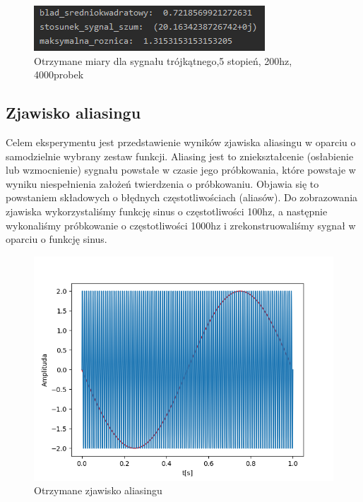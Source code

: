 \documentclass[12pt]{article}
\begin{document}
\begin{figure}[H]
\centering
\includegraphics[scale=0.9]{9trojkatMiary.png}
\caption{Otrzymane miary dla sygnału trójkątnego,5 stopień, 200hz, 4000probek}
\end{figure}



\subsection{Zjawisko aliasingu}
Celem eksperymentu jest przedstawienie wyników zjawiska aliasingu w oparciu o samodzielnie wybrany zestaw funkcji. Aliasing jest to zniekształcenie (osłabienie lub wzmocnienie) sygnału powstałe w czasie jego próbkowania, które powstaje w wyniku niespełnienia założeń twierdzenia o próbkowaniu. Objawia się to powstaniem składowych o błędnych częstotliwościach (aliasów).
\newline
Do zobrazowania zjawiska wykorzystaliśmy funkcję sinus o częstotliwości 100hz, a następnie wykonaliśmy próbkowanie o częstotliwości 1000hz i zrekonstruowaliśmy sygnał w oparciu o funkcję sinus.

\begin{figure}[H]
\centering
\includegraphics[scale=0.8]{666aliasing.png}
\caption{Otrzymane zjawisko aliasingu}
\end{figure}
\end{document}
